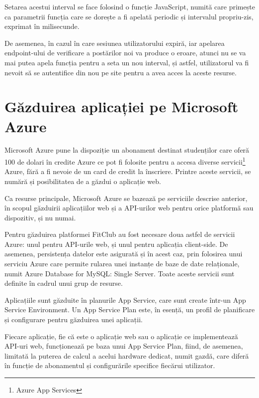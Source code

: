 Setarea acestui interval se face folosind o funcție JavaScript, numită  care primește ca parametrii funcția care se dorește a fi apelată periodic și intervalul propriu-zis, exprimat în milisecunde.\newline

De asemenea, în cazul în care sesiunea utilizatorului expiră, iar apelarea endpoint-ului de verificare a postărilor noi va produce o eroare, atunci nu se va mai putea apela funcția  pentru a seta un nou interval, și astfel, utilizatorul va fi nevoit să se autentifice din nou pe site pentru a avea acces la aceste resurse.\newline

\section{Găzduirea aplicației pe Microsoft Azure}

Microsoft Azure pune la dispoziție un abonament destinat studenților care oferă 100 de dolari în credite Azure ce pot fi folosite pentru a accesa diverse servicii\footnote{Azure App Services} Azure, fără a fi nevoie de un card de credit la înscriere. Printre aceste servicii, se numără și posibilitatea de a găzdui o aplicație web.\newline

Ca resurse principale, Microsoft Azure se bazează pe serviciile descrise anterior, în scopul găzduirii aplicațiilor web și a API-urilor web pentru orice platformă sau dispozitiv, și nu numai\cite{.azure}.\newline

Pentru găzduirea platformei FitClub au fost necesare doua astfel de servicii Azure: unul pentru API-urile web, și unul pentru aplicația client-side. De asemenea, persistența datelor este asigurată și în acest caz, prin folosirea unui serviciu Azure care permite rularea unei instanțe de baze de date relaționale, numit Azure Database for MySQL: Single Server. Toate aceste servicii sunt definite în cadrul unui grup de resurse.\newline

Aplicațiile sunt găzduite în planurile App Service, care sunt create într-un App Service Environment. Un App Service Plan este, în esență, un profil de planificare și configurare pentru găzduirea unei aplicații.\newline

Fiecare aplicație, fie că este o aplicație web sau o aplicație ce implementează API-uri web, funcționează pe baza unui App Service Plan, fiind, de asemenea, limitată la puterea de calcul a acelui hardware dedicat, numit gazdă, care diferă în funcție de abonamentul și configurările specifice fiecărui utilizator\cite{.azurebook}.\newline

